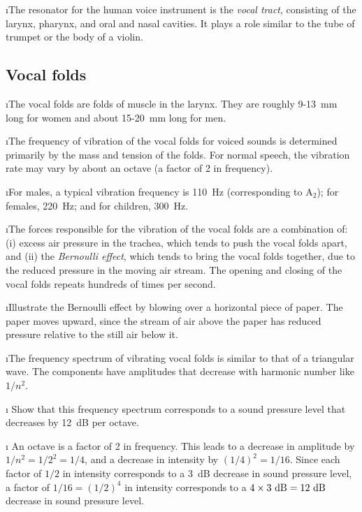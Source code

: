 \i The resonator for the human voice instrument is
the {\em vocal tract}, consisting of the larynx, pharynx,
and oral and nasal cavities.
It plays a role similar to the tube of trumpet or the
body of a violin.

\ei
\subsection{Vocal folds}
\bi

\i The vocal folds are folds of muscle in the larynx.
They are roughly 9-13~mm long for women and about 
15-20~mm long for men.

\i The frequency of vibration of the vocal folds 
for voiced sounds is determined primarily by the 
mass and tension of the folds.
For normal speech, the vibration rate may vary by 
about an octave (a factor of 2 in frequency).

\i For males, a typical vibration frequency is 
110~Hz (corresponding to A${}_2$); 
for females, 220~Hz; and for children, 300~Hz.

\i The forces responsible for the vibration of the 
vocal folds are a combination of: 
(i) excess air pressure in the trachea, which tends 
to push the vocal folds apart, and 
(ii) the {\em Bernoulli effect}, which tends to 
bring the vocal folds together, due to the reduced
pressure in the moving air stream.
The opening and closing of the vocal
folds repeats hundreds of times per second.

\i \demo Illustrate the Bernoulli effect by blowing
over a horizontal piece of paper.
The paper moves upward, since the stream of air
above the paper has 
reduced pressure relative to the still air below it.

\i The frequency spectrum of vibrating vocal folds
is similar to that of a triangular wave.
The components have amplitudes that decrease with
harmonic number like $1/n^2$.

\i \exer
Show that this frequency spectrum corresponds to a 
sound pressure level that decreases by 12~dB per octave.

\i \ans
An octave is a factor of 2 in frequency.
This leads to a decrease in amplitude by $1/n^2 = 1/2^2 = 1/4$,
and a decrease in intensity by $(1/4)^2=1/16$.  
Since each factor of $1/2$ in intensity corresponds to 
a 3~dB decrease in sound pressure level, a factor of
$1/16=(1/2)^4$ in intensity corresponds to a 
$4\times 3~{\rm dB} = 12~{\rm dB}$ 
decrease in sound pressure level.

